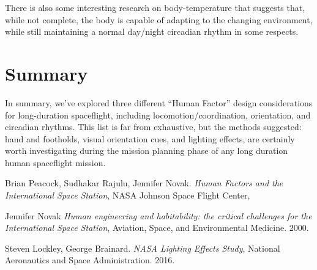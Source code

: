 \documentclass{article}
\begin{document}
  There is also some interesting research on body-temperature that suggests that, while not complete, the body is capable of adapting to the changing environment, while still maintaining a normal day/night circadian rhythm in some respects.

  \section{Summary}

  In summary, we've explored three different ``Human Factor'' design considerations for long-duration spaceflight, including locomotion/coordination, orientation, and circadian rhythms. This list is far from exhaustive, but the methods suggested: hand and footholds, visual orientation cues, and lighting effects, are certainly worth investigating during the mission planning phase of any long duration human spaceflight mission.

\begin{thebibliography}{9}

    Brian Peacock, Sudhakar Rajulu, Jennifer Novak.
    \textit{Human Factors and the International Space Station},
    NASA Johnson Space Flight Center,

    Jennifer Novak
    \textit{Human engineering and habitability: the critical challenges for the International Space Station},
    Aviation, Space, and Environmental Medicine.
    2000.

    Steven Lockley, George Brainard.
    \textit{NASA Lighting Effects Study},
    National Aeronautics and Space Administration.
    2016.

\end{thebibliography}
\end{document}
